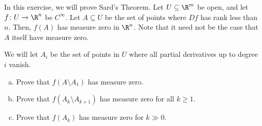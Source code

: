 \documentclass[10pt]{mypackage}
\begin{document}
\begin{problem}[Problem 3]
  In this exercise, we will prove Sard's Theorem. Let $U\subseteq \R^{m}$ be open, and let $f\colon U\rightarrow \R^{n}$ be $C^{\infty}$. Let $A\subseteq U$ be the set of points where $Df$ has rank less than $n$. Then, $f(A)$ has measure zero in $\R^{n}$. Note that it need not be the case that $A$ itself have measure zero.\newline

  We will let $A_i$ be the set of points in $U$ where all partial derivatives up to degree $i$ vanish.
  \begin{enumerate}[(a)]
    \item Prove that $f\left( A\setminus A_1 \right)$ has measure zero.
    \item Prove that $f\left( A_k\setminus A_{k+1} \right)$ has measure zero for all $k \geq 1$.
    \item Prove that $f\left( A_k \right)$ has measure zero for $k\gg 0$.
  \end{enumerate}
\end{problem}
\end{document}
